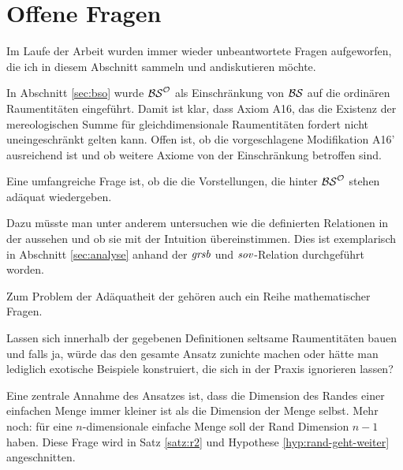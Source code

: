 
    \section{Offene Fragen}\label{sec:offene-fragen}
    Im Laufe der Arbeit wurden immer wieder unbeantwortete Fragen aufgeworfen, die ich in diesem Abschnitt sammeln und andiskutieren möchte.
    
    In
    \marginpar{$\theoryBSO$}
    Abschnitt \ref{sec:bso} wurde $\theoryBSO$ als Einschränkung von $\mathcal{BS}$ auf die ordinären Raumentitäten eingeführt. Damit ist klar, dass Axiom A16, das die Existenz der mereologischen Summe für gleichdimensionale Raumentitäten fordert nicht uneingeschränkt gelten kann. Offen ist, ob die vorgeschlagene Modifikation A16' ausreichend ist und ob weitere Axiome von der Einschränkung betroffen sind.
    
    Eine umfangreiche Frage ist, ob die \strukt die Vorstellungen, die hinter $\theoryBSO$ stehen adäquat wiedergeben.
    
    Dazu
    müsste man unter anderem untersuchen wie die definierten Relationen in der \strukt aussehen und ob sie mit der Intuition übereinstimmen. 
    Dies ist exemplarisch in Abschnitt \ref{sec:analyse} anhand der $\mathit{gr\hspace*{-0.25ex}sb}$ und $\mathit{sov}$-Relation durchgeführt worden.
    
    Zum Problem der Adäquatheit der \strukt gehören auch ein Reihe mathematischer Fragen.
    
    
    Lassen
    sich innerhalb der gegebenen Definitionen seltsame Raumentitäten bauen und falls ja, würde das den gesamte Ansatz zunichte machen oder hätte man lediglich exotische Beispiele konstruiert, die sich in der Praxis ignorieren lassen?
    
    Eine
    zentrale Annahme des Ansatzes ist, dass die Dimension des Randes einer einfachen Menge immer kleiner ist als die Dimension der Menge selbst. Mehr noch: für eine $n$-dimensionale einfache Menge soll der Rand Dimension $n-1$ haben.
    Diese Frage wird in Satz \ref{satz:r2} und Hypothese \ref{hyp:rand-geht-weiter} 
    angeschnitten.

